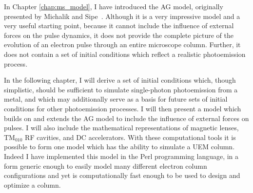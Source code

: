 In Chapter \ref{chap:ms_model}, I have introduced the AG model, originally presented by Michalik and Sipe~\cite{michalik_analytic_2006}.
Although it is a very impressive model and a very useful starting point, because it cannot include the influence of external forces on the pulse dynamics, it does not provide the complete picture of the evolution of an electron pulse through an entire microscope column.
Further, it does not contain a set of initial conditions which reflect a realistic photoemission process.

In the following chapter, I will derive a set of initial conditions which, though simplistic, should be sufficient to simulate single-photon photoemission from a metal, and which may additionally serve as a basis for future sets of initial conditions for other photoemission processes.
I will then present a model which builds on and extends the AG model to include the influence of external forces on pulses.
I will also include the mathematical representations of magnetic lenses, TM$_{010}$ RF cavities, and DC accelerators.
With these computational tools it is possible to form one model which has the ability to simulate a UEM column.
Indeed I have implemented this model in the Perl programming language, in a form generic enough to easily model many different electron column configurations and yet is computationally fast enough to be used to design and optimize a column.
